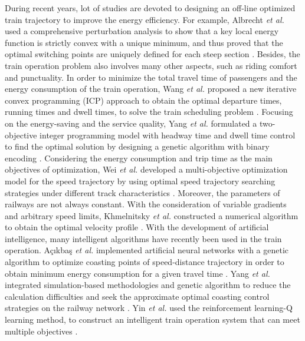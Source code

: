 \documentclass[journal]{IEEEtran}
\begin{document}
\par During recent years, lot of studies are devoted to designing an off-line optimized train trajectory to improve the energy efficiency. For example, Albrecht \emph{et al.} used a comprehensive perturbation analysis to show that a key local energy function is strictly convex with a unique minimum, and thus proved that the optimal switching points are uniquely defined for each steep section \cite{albrecht2013energy}. 
Besides, the train operation problem also involves many other aspects, such as riding comfort and punctuality. In order to minimize the total travel time of passengers and the energy consumption of the train operation, Wang \emph{et al.} proposed a new iterative convex programming (ICP) approach to obtain the optimal departure times, running times and dwell times, to solve the train scheduling problem \cite{wang2015efficient}. Focusing on the energy-saving and the service quality, Yang \emph{et al.} formulated a two-objective integer programming model with headway time and dwell time control to find the optimal solution by designing a genetic algorithm with binary encoding \cite{yang2014two}. Considering the energy consumption and trip time as the main objectives of optimization, Wei \emph{et al.} developed a multi-objective optimization model for the speed trajectory by using optimal speed trajectory searching strategies under different track characteristics \cite{shangguan2015multiobjective}. Moreover, the parameters of railways are not always constant. With the consideration of variable gradients and arbitrary speed limits, Khmelnitsky \emph{et al.} constructed a numerical algorithm to obtain the optimal velocity profile \cite{khmelnitsky2000optimal}. With the development of artificial intelligence, many intelligent algorithms have recently been used in the train operation. Açıkbaş \emph{et al.} implemented artificial neural networks with a genetic algorithm to optimize coasting points of speed-distance trajectory in order to obtain minimum energy consumption for a given travel time \cite{accikbacs2008coasting}. Yang \emph{et al.} integrated simulation-based methodologies and genetic algorithm to reduce the calculation difficulties and seek the approximate optimal coasting control strategies on the railway network \cite{yang2012optimizing}. Yin \emph{et al.} used the reinforcement learning-Q learning method, to construct an intelligent train operation system that can meet multiple objectives \cite{yin2014intelligent}.
\end{document}
